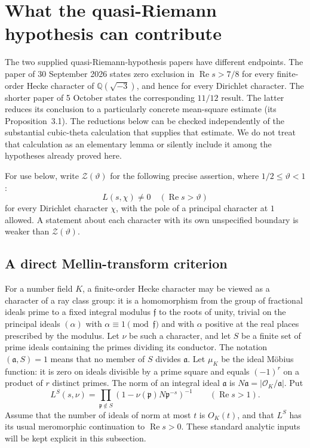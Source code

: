 \section{What the quasi-Riemann hypothesis can contribute}
\label{sec:qrh-contribution}

The two supplied quasi-Riemann-hypothesis papers have different endpoints.\cite{qrh-september,qrh-october}
The paper of 30 September 2026 states zero exclusion in
$\operatorname{Re}s>7/8$ for every finite-order Hecke character of
$\mathbb Q(\sqrt{-3})$, and hence for every Dirichlet character.
The shorter paper of 5 October states the corresponding $11/12$ result.
The latter reduces its conclusion to a particularly concrete mean-square
estimate (its Proposition~3.1). The reductions below can be checked
independently of the substantial cubic-theta calculation that supplies
that estimate. We do not treat that calculation as an elementary lemma
or silently include it among the hypotheses already proved here.

For use below, write $\mathcal Z(\vartheta)$ for the following precise
assertion, where $1/2\leq\vartheta<1$:
\[
 L(s,\chi)\ne0\quad(\operatorname{Re}s>\vartheta)
\]
for every Dirichlet character $\chi$, with the pole of a principal
character at $1$ allowed. A statement about each character with its
own unspecified boundary is weaker than $\mathcal Z(\vartheta)$.

\subsection{A direct Mellin-transform criterion}

For a number field $K$, a finite-order Hecke character may be
viewed as a character of a ray class group: it is a homomorphism from
the group of fractional ideals prime to a fixed integral modulus
$\mathfrak f$ to the roots of unity, trivial on the principal ideals
$(\alpha)$ with $\alpha\equiv1\pmod{\mathfrak f}$ and with
$\alpha$ positive at the real places prescribed by the modulus.
Let $\nu$ be such a character, and let $S$ be a finite set of prime
ideals containing the primes dividing its conductor. The notation
$(\mathfrak a,S)=1$ means that no member of $S$ divides
$\mathfrak a$. Let $\mu_K$ be the ideal M\"obius function: it is zero on ideals
divisible by a prime square and equals $(-1)^r$ on a product of $r$
distinct primes. The norm of an integral ideal $\mathfrak a$ is
$N\mathfrak a=|\mathcal O_K/\mathfrak a|$. Put
\[
 L^S(s,\nu)=\prod_{\mathfrak p\notin S}
       (1-\nu(\mathfrak p)N\mathfrak p^{-s})^{-1}
       \qquad(\operatorname{Re}s>1).
\]
Assume that the number of ideals of norm at most $t$ is $O_K(t)$,
and that $L^S$ has its usual meromorphic continuation to
$\operatorname{Re}s>0$. These standard analytic inputs will be kept
explicit in this subsection.

